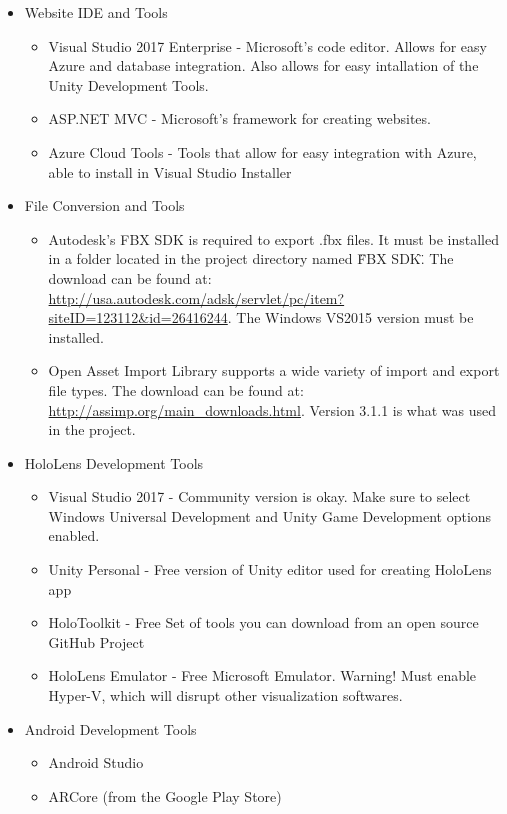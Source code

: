 \begin{itemize}

    \item Website IDE and Tools
    \begin{itemize}
        \item Visual Studio 2017 Enterprise - Microsoft's code editor. Allows for easy Azure and database
        integration. Also allows for easy intallation of the Unity Development Tools.
        \item ASP.NET MVC - Microsoft's framework for creating websites.
        \item Azure Cloud Tools - Tools that allow for easy integration with Azure, able to install in Visual Studio Installer
    \end{itemize}

    \item File Conversion and Tools
    \begin{itemize}
        \item Autodesk's FBX SDK is required to export .fbx files.  It must be installed in a folder located in the project directory named \"FBX SDK\".  The download can be found at: 
        \url{http://usa.autodesk.com/adsk/servlet/pc/item?siteID=123112&id=26416244}.
        The Windows VS2015 version must be installed.

        \item Open Asset Import Library supports a wide variety of import and export file types.  The download can be found at: \url{http://assimp.org/main_downloads.html}.  Version 3.1.1 is what was used in the project.         
    \end{itemize}

    \item HoloLens Development Tools
    \begin{itemize}
        \item Visual Studio 2017 - Community version is okay. Make sure to select Windows Universal Development and Unity Game Development options enabled.

        \item Unity Personal - Free version of Unity editor used for creating HoloLens app

        \item HoloToolkit - Free Set of tools you can download from an open source GitHub Project

        \item HoloLens Emulator - Free Microsoft Emulator. Warning! Must enable Hyper-V, which will disrupt other visualization softwares.

    \end{itemize}

    \item Android Development Tools
    \begin{itemize}
        \item Android Studio
        \item ARCore (from the Google Play Store)
    \end{itemize}
\end{itemize}


